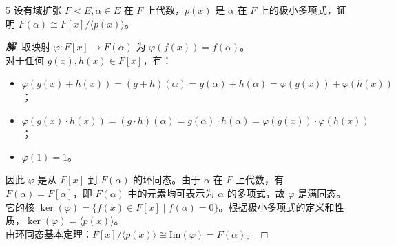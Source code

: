 \documentclass[12pt, a4paper]{article}
\newenvironment{solution}{
    \begin{proof}[\textbf{解}]
}{
    \end{proof}
}
\begin{document}
\begin{problem}{5}
    设有域扩张 $F<E, \alpha \in E$ 在 $F$ 上代数，$p(x)$ 是 $\alpha$ 在 $F$ 上的极小多项式，证明 $F(\alpha) \cong F[x] / \langle p(x) \rangle$。
\end{problem}
\begin{solution}
    取映射 $\varphi: F[x] \to F(\alpha)$ 为 $\varphi(f(x)) = f(\alpha)$。\\
    对于任何 $g(x), h(x) \in F[x]$，有：
    \begin{itemize}
        \item $\varphi(g(x)+h(x)) = (g+h)(\alpha) = g(\alpha)+h(\alpha) = \varphi(g(x)) + \varphi(h(x))$；
        \item $\varphi(g(x) \cdot h(x)) = (g \cdot h)(\alpha) = g(\alpha) \cdot h(\alpha) = \varphi(g(x)) \cdot \varphi(h(x))$；
        \item $\varphi(1) = 1$。
    \end{itemize}
    因此 $\varphi$ 是从 $F[x]$ 到 $F(\alpha)$ 的环同态。由于 $\alpha$ 在 $F$ 上代数，有 $F(\alpha) = F[\alpha]$，即 $F(\alpha)$ 中的元素均可表示为 $\alpha$ 的多项式，故 $\varphi$ 是满同态。\\
    它的核 $\ker(\varphi) = \{f(x) \in F[x] \mid f(\alpha) = 0\}$。根据极小多项式的定义和性质，$\ker(\varphi) = \langle p(x) \rangle$。\\
    由环同态基本定理：$F[x] / \langle p(x) \rangle \cong \text{Im}(\varphi) = F(\alpha)$。
\end{solution}
\end{document}
